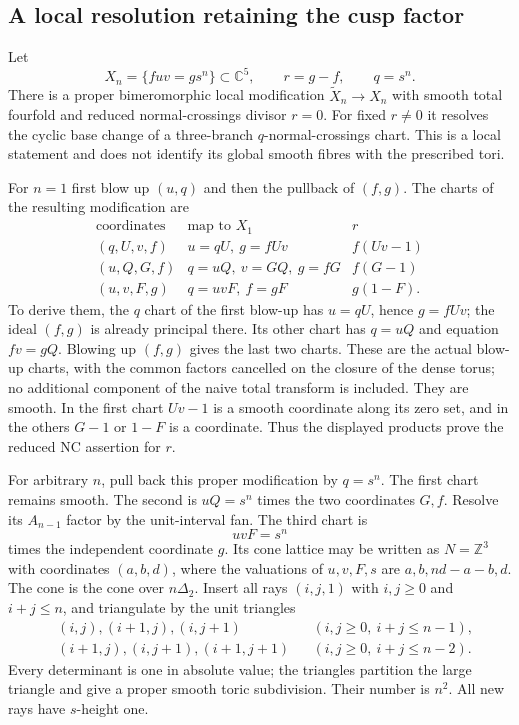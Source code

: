 \subsection*{A local resolution retaining the cusp factor}

Let
\[
 X_n=\{fuv=g s^n\}\subset\mathbb C^5,
 \qquad r=g-f,\qquad q=s^n.
\]
There is a proper bimeromorphic local modification
$\widetilde X_n\to X_n$ with smooth total fourfold
and reduced normal-crossings divisor $r=0$.
For fixed $r\ne0$ it resolves the cyclic base change
of a three-branch $q$-normal-crossings chart.
This is a local statement and does not identify its
global smooth fibres with the prescribed tori.

For $n=1$ first blow up $(u,q)$ and then the pullback
of $(f,g)$. The charts of the resulting modification are
\[
\begin{array}{c|c|c}
 \text{coordinates}&\text{map to }X_1&r\\\hline
 (q,U,v,f)&u=qU,\ g=fUv&f(Uv-1)\\
 (u,Q,G,f)&q=uQ,\ v=GQ,\ g=fG&f(G-1)\\
 (u,v,F,g)&q=uvF,\ f=gF&g(1-F).
\end{array}
\]
To derive them, the $q$ chart of the first blow-up
has $u=qU$, hence $g=fUv$; the ideal $(f,g)$ is
already principal there. Its other chart has
$q=uQ$ and equation $fv=gQ$. Blowing up $(f,g)$
gives the last two charts. These are the actual
blow-up charts, with the common factors cancelled
on the closure of the dense torus; no additional
component of the naive total transform is included.
They are smooth. In the first chart $Uv-1$ is a
smooth coordinate along its zero set, and in the
others $G-1$ or $1-F$ is a coordinate. Thus the
displayed products prove the reduced NC assertion
for $r$.

For arbitrary $n$, pull back this proper modification
by $q=s^n$. The first chart remains smooth. The
second is $uQ=s^n$ times the two coordinates $G,f$.
Resolve its $A_{n-1}$ factor by the unit-interval fan.
The third chart is
\[
 uvF=s^n
\]
times the independent coordinate $g$. Its cone lattice
may be written as $N=\mathbb Z^3$ with coordinates
$(a,b,d)$, where the valuations of $u,v,F,s$ are
$a,b,nd-a-b,d$. The cone is the cone over
$n\Delta_2$. Insert all rays $(i,j,1)$ with
$i,j\ge0$ and $i+j\le n$, and triangulate by the
unit triangles
\[
\begin{aligned}
 &(i,j),(i+1,j),(i,j+1) &&(i,j\ge0,\ i+j\le n-1),\\
 &(i+1,j),(i,j+1),(i+1,j+1)
                       &&(i,j\ge0,\ i+j\le n-2).
\end{aligned}
\]
Every determinant is one in absolute value; the
triangles partition the large triangle and give a
proper smooth toric subdivision. Their number is
$n^2$. All new rays have $s$-height one.

